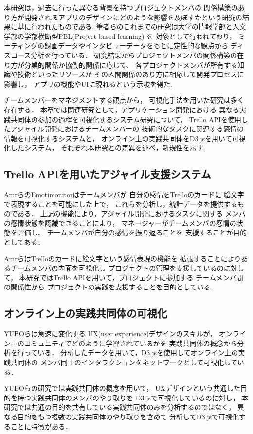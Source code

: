
本研究は，過去に行った異なる背景を持つプロジェクトメンバの
関係構築のあり方が開発されるアプリのデザインにどのような影響を及ぼすかという研究\cite{preStudy}の結果に基に行われたものである.
筆者らのこれまでの研究は大学の情報学部と人文学部の学部横断型PBL(Project based learning) を
対象として行われており，
ミーティングの録画データやインタビューデータをもとに定性的な観点から
ディスコース分析を行っている．
研究結果からプロジェクトメンバの関係構築の在り方が分業的関係か協働的関係に応じて、
各プロジェクトメンバが所有する知識や技術といったリソースが
その人間関係のあり方に相応して開発プロセスに影響し，
アプリの機能やUIに現れるという示唆を得た.


チームメンバーをマネジメントする観点から，
可視化手法を用いた研究は多く存在する．
本章では関連研究として，アプリケーション開発における
異なる実践共同体の参加の過程を可視化するシステム研究について，
Trello APIを使用したアジャイル開発におけるチームメンバーの
技術的なタスクに関連する感情の情報を可視化するシステムと，
オンライン上の実践共同体をD3.jsを用いて可視化したシステム，
それぞれ本研究との差異を述べ，新規性を示す.

\subsection{Trello APIを用いたアジャイル支援システム}
AmrらのEmotimonitor\cite{Emotimonitor}はチームメンバが
自分の感情をTrelloのカードに
絵文字で表現することを可能にした上で，
これらを分析し，統計データを提供するものである．
上記の機能により，アジャイル開発におけるタスクに関する
メンバの感情状態を認識できることにより，
マネージャーがチームメンバの感情の状態を評価し、
チームメンバが自分の感情を振り返ることを
支援することが目的としてある．

AmrらはTrelloのカードに絵文字という感情表現の機能を
拡張することによりあるチームメンバの内面を可視化し
プロジェクトの管理を支援しているのに対して，
本研究ではTrello APIを用いて，プロジェクトに参加する
チームメンバ間の関係性から
プロジェクトの実践を支援することを目的としている．　　　
\subsection{オンライン上の実践共同体の可視化}
YUBOら\cite{D3jsOfCop}は急速に変化する
UX(user experience)デザインのスキルが，
オンライン上のコミュニティでどのように学習されているかを
実践共同体の概念から分析を行っている．
分析したデータを用いて，D3.jsを使用してオンライン上の実践共同体の
メンバ同士のインタラクションをネットワークとして可視化している．

YUBOらの研究では実践共同体の概念を用いて，
UXデザインという共通した目的を持つ実践共同体のメンバのやり取りを
D3.jsで可視化しているのに対し，
本研究では共通の目的を共有している実践共同体のみを分析するのではなく，
異なる目的をもつ複数の実践共同体のやり取りを含めて
分析してD3.jsで可視化することに特徴がある．
